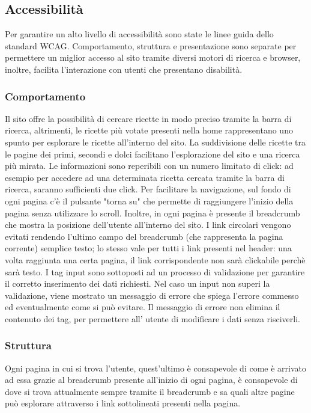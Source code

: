 \subsection{Accessibilità}
\label{sub:accessibilità}
Per garantire un alto livello di accessibilità sono state le linee guida dello standard WCAG. Comportamento, struttura e presentazione sono separate per permettere un miglior accesso al sito tramite diversi motori di ricerca e browser, inoltre, facilita l'interazione con utenti che presentano disabilità.

\subsubsection{Comportamento}
Il sito offre la possibilità di cercare ricette in modo preciso tramite la barra di ricerca, altrimenti, le ricette più votate presenti nella home rappresentano uno spunto per esplorare le ricette all'interno del sito. La suddivisione delle ricette tra le pagine dei primi, secondi e dolci facilitano l'esplorazione del sito e una ricerca più mirata. Le informazioni sono reperibili con un numero limitato di click: ad esempio per accedere ad una determinata ricetta cercata tramite la barra di ricerca, saranno sufficienti due click.
Per facilitare la navigazione, sul fondo di ogni pagina c'è il pulsante "torna su" che permette di raggiungere l'inizio della pagina senza utilizzare lo scroll. Inoltre, in ogni pagina è presente il breadcrumb che mostra la posizione dell'utente all'interno del sito. I link circolari vengono evitati rendendo l'ultimo campo del breadcrumb (che rappresenta la pagina corrente) semplice testo; lo stesso vale per tutti i link presenti nel header: una volta raggiunta una certa pagina, il link corrispondente non sarà clickabile perchè sarà testo.
I tag input sono sottoposti ad un processo di validazione per garantire il corretto inserimento dei dati richiesti. Nel caso un input non superi la validazione, viene mostrato un messaggio di errore che spiega l'errore commesso ed eventualmente come si può evitare. Il messaggio di errore non elimina il contenuto dei tag, per permettere all' utente di modificare i dati senza risciverli.

\subsubsection{Struttura}
Ogni pagina in cui si trova l'utente, quest'ultimo è consapevole di come è arrivato ad essa grazie al breadcrumb presente all'inizio di ogni pagina, è consapevole di dove si trova attualmente sempre tramite il breadcrumb e sa quali altre pagine può esplorare attraverso i link sottolineati presenti nella pagina. 

